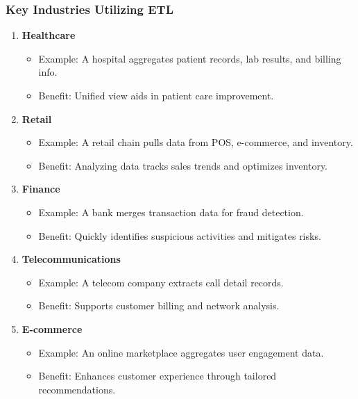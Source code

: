 \documentclass[aspectratio=169]{beamer}
\begin{document}
\begin{frame}[fragile]
    \frametitle{Key Industries Utilizing ETL}
    \begin{enumerate}
        \item \textbf{Healthcare}
            \begin{itemize}
                \item Example: A hospital aggregates patient records, lab results, and billing info.
                \item Benefit: Unified view aids in patient care improvement.
            \end{itemize}
        
        \item \textbf{Retail}
            \begin{itemize}
                \item Example: A retail chain pulls data from POS, e-commerce, and inventory.
                \item Benefit: Analyzing data tracks sales trends and optimizes inventory.
            \end{itemize}
        
        \item \textbf{Finance}
            \begin{itemize}
                \item Example: A bank merges transaction data for fraud detection.
                \item Benefit: Quickly identifies suspicious activities and mitigates risks.
            \end{itemize}
        
        \item \textbf{Telecommunications}
            \begin{itemize}
                \item Example: A telecom company extracts call detail records.
                \item Benefit: Supports customer billing and network analysis.
            \end{itemize}
        
        \item \textbf{E-commerce}
            \begin{itemize}
                \item Example: An online marketplace aggregates user engagement data.
                \item Benefit: Enhances customer experience through tailored recommendations.
            \end{itemize}
    \end{enumerate}
\end{frame}
\end{document}

